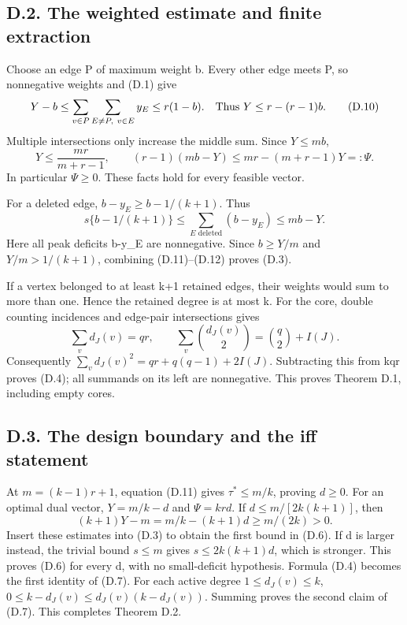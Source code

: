 \documentclass[
  11pt,
]{article}
\begin{document}
\subsection{D.2. The weighted estimate and finite
extraction}\label{d.2.-the-weighted-estimate-and-finite-extraction}

Choose an edge P of maximum weight b. Every other edge meets P, so
nonnegative weights and (D.1) give \[
 Y-b\le\sum_{v\in P}\sum_{E\ne P,\ v\in E}y_E\le r(1-b).
 \quad\hbox{Thus }Y\le r-(r-1)b.                            \tag{D.10}
\] Multiple intersections only increase the middle sum. Since
\(Y\le mb\), \[
             Y\le\frac{mr}{m+r-1},\qquad
 (r-1)(mb-Y)\le mr-(m+r-1)Y=:\Psi.                         \tag{D.11}
\] In particular \(\Psi\ge0\). These facts hold for every feasible
vector.

For a deleted edge, \(b-y_E\ge b-1/(k+1)\). Thus \[
 s\{b-1/(k+1)\}\le\sum_{E\text{ deleted}}(b-y_E)
                           \le mb-Y.                      \tag{D.12}
\] Here all peak deficits b-y\_E are nonnegative. Since \(b\ge Y/m\) and
\(Y/m>1/(k+1)\), combining (D.11)--(D.12) proves (D.3).

If a vertex belonged to at least k+1 retained edges, their weights would
sum to more than one. Hence the retained degree is at most k. For the
core, double counting incidences and edge-pair intersections gives \[
 \sum_v d_J(v)=qr,\qquad
 \sum_v\binom{d_J(v)}2=\binom q2+I(J).
\] Consequently \(\sum_v d_J(v)^2=qr+q(q-1)+2I(J)\). Subtracting this
from kqr proves (D.4); all summands on its left are nonnegative. This
proves Theorem D.1, including empty cores.

\subsection{D.3. The design boundary and the iff
statement}\label{d.3.-the-design-boundary-and-the-iff-statement}

At \(m=(k-1)r+1\), equation (D.11) gives \(\tau^*\le m/k\), proving
\(d\ge0\). For an optimal dual vector, \(Y=m/k-d\) and \(\Psi=krd\). If
\(d\le m/[2k(k+1)]\), then \[
              (k+1)Y-m=m/k-(k+1)d\ge m/(2k)>0.
\] Insert these estimates into (D.3) to obtain the first bound in (D.6).
If d is larger instead, the trivial bound \(s\le m\) gives
\(s\le2k(k+1)d\), which is stronger. This proves (D.6) for every d, with
no small-deficit hypothesis. Formula (D.4) becomes the first identity of
(D.7). For each active degree \(1\le d_J(v)\le k\),
\(0\le k-d_J(v)\le d_J(v)(k-d_J(v))\). Summing proves the second claim
of (D.7). This completes Theorem D.2.
\end{document}
